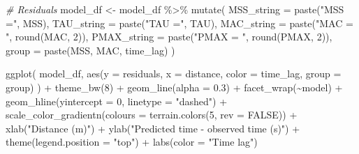 \documentclass[fleqn,10pt,lineno]{wlpeerj} %
\newenvironment{Shaded}{\begin{snugshade}}{\end{snugshade}}
\newcommand{\AttributeTok}[1]{\textcolor[rgb]{0.77,0.63,0.00}{#1}}
\newcommand{\CommentTok}[1]{\textcolor[rgb]{0.56,0.35,0.01}{\textit{#1}}}
\newcommand{\ConstantTok}[1]{\textcolor[rgb]{0.00,0.00,0.00}{#1}}
\newcommand{\DecValTok}[1]{\textcolor[rgb]{0.00,0.00,0.81}{#1}}
\newcommand{\FloatTok}[1]{\textcolor[rgb]{0.00,0.00,0.81}{#1}}
\newcommand{\FunctionTok}[1]{\textcolor[rgb]{0.00,0.00,0.00}{#1}}
\newcommand{\NormalTok}[1]{#1}
\newcommand{\OtherTok}[1]{\textcolor[rgb]{0.56,0.35,0.01}{#1}}
\newcommand{\SpecialCharTok}[1]{\textcolor[rgb]{0.00,0.00,0.00}{#1}}
\newcommand{\StringTok}[1]{\textcolor[rgb]{0.31,0.60,0.02}{#1}}
\begin{document}
\begin{Shaded}
\begin{Highlighting}[]
\CommentTok{\# Residuals}
\NormalTok{model\_df }\OtherTok{\textless{}{-}}\NormalTok{ model\_df }\SpecialCharTok{\%\textgreater{}\%}
  \FunctionTok{mutate}\NormalTok{(}
    \AttributeTok{MSS\_string =} \FunctionTok{paste}\NormalTok{(}\StringTok{"MSS ="}\NormalTok{, MSS),}
    \AttributeTok{TAU\_string =} \FunctionTok{paste}\NormalTok{(}\StringTok{"TAU ="}\NormalTok{, TAU),}
    \AttributeTok{MAC\_string =} \FunctionTok{paste}\NormalTok{(}\StringTok{"MAC = "}\NormalTok{, }\FunctionTok{round}\NormalTok{(MAC, }\DecValTok{2}\NormalTok{)),}
    \AttributeTok{PMAX\_string =} \FunctionTok{paste}\NormalTok{(}\StringTok{"PMAX = "}\NormalTok{, }\FunctionTok{round}\NormalTok{(PMAX, }\DecValTok{2}\NormalTok{)),}
    \AttributeTok{group =} \FunctionTok{paste}\NormalTok{(MSS, MAC, time\_lag)}
\NormalTok{  )}

\FunctionTok{ggplot}\NormalTok{(}
\NormalTok{  model\_df,}
  \FunctionTok{aes}\NormalTok{(}\AttributeTok{y =}\NormalTok{ residuals, }\AttributeTok{x =}\NormalTok{ distance, }\AttributeTok{color =}\NormalTok{ time\_lag, }\AttributeTok{group =}\NormalTok{ group)}
\NormalTok{) }\SpecialCharTok{+}
  \FunctionTok{theme\_bw}\NormalTok{(}\DecValTok{8}\NormalTok{) }\SpecialCharTok{+}
  \FunctionTok{geom\_line}\NormalTok{(}\AttributeTok{alpha =} \FloatTok{0.3}\NormalTok{) }\SpecialCharTok{+}
  \FunctionTok{facet\_wrap}\NormalTok{(}\SpecialCharTok{\textasciitilde{}}\NormalTok{model) }\SpecialCharTok{+}
  \FunctionTok{geom\_hline}\NormalTok{(}\AttributeTok{yintercept =} \DecValTok{0}\NormalTok{, }\AttributeTok{linetype =} \StringTok{"dashed"}\NormalTok{) }\SpecialCharTok{+}
  \FunctionTok{scale\_color\_gradientn}\NormalTok{(}\AttributeTok{colours =} \FunctionTok{terrain.colors}\NormalTok{(}\DecValTok{5}\NormalTok{, }\AttributeTok{rev =} \ConstantTok{FALSE}\NormalTok{)) }\SpecialCharTok{+}
  \FunctionTok{xlab}\NormalTok{(}\StringTok{"Distance (m)"}\NormalTok{) }\SpecialCharTok{+}
  \FunctionTok{ylab}\NormalTok{(}\StringTok{"Predicted time {-} observed time (s)"}\NormalTok{)  }\SpecialCharTok{+}
  \FunctionTok{theme}\NormalTok{(}\AttributeTok{legend.position =} \StringTok{"top"}\NormalTok{) }\SpecialCharTok{+} 
  \FunctionTok{labs}\NormalTok{(}\AttributeTok{color =} \StringTok{"Time lag"}\NormalTok{)}
\end{Highlighting}
\end{Shaded}
\end{document}
